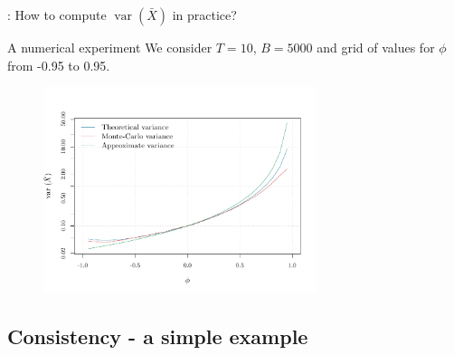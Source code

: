 \documentclass[envcountsect,usenames,dvipsnames]{beamer}
\DeclareMathOperator*{\var}{var}
\theoremstyle{mystyle}
\begin{document}
\begin{frame}{\thesubsection: How to compute $\var \left(\bar{X}\right)$ in practice?}
	\begin{exampleblock}{A numerical experiment}
		We consider $T = 10$, $B = 5000$ and grid of values for $\phi$ from -0.95 to 0.95.
	\end{exampleblock}
	
	\vspace{-0.15cm}
	
	\begin{figure}
	    \centering
	  \includegraphics[width = 8cm]{Images/xbarExample}
	\end{figure}	
	
	

\hyperlink{eq.varxbar}{}

\end{frame}

\subsection{Consistency - a simple example} 
\label{app:consist:simple}
\end{document}
